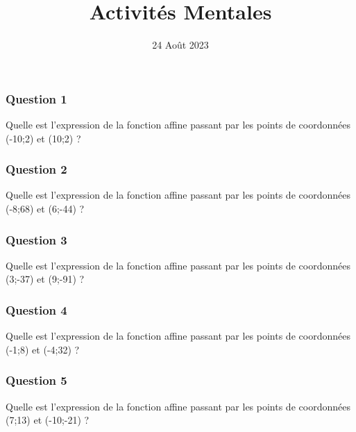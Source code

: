 \documentclass[15pt, mathserif]{beamer}
\title{Activités Mentales}
\date{24 Août 2023}
\begin{document}
\begin{frame}
    \titlepage
\end{frame}

\begin{frame} 
	\frametitle{Question 1}
Quelle est l'expression de la fonction affine passant par les points de coordonnées (-10;2) et (10;2) ?\end{frame}


\begin{frame} 
	\frametitle{Question 2}
Quelle est l'expression de la fonction affine passant par les points de coordonnées (-8;68) et (6;-44) ?\end{frame}


\begin{frame} 
	\frametitle{Question 3}
Quelle est l'expression de la fonction affine passant par les points de coordonnées (3;-37) et (9;-91) ?\end{frame}


\begin{frame} 
	\frametitle{Question 4}
Quelle est l'expression de la fonction affine passant par les points de coordonnées (-1;8) et (-4;32) ?\end{frame}


\begin{frame} 
	\frametitle{Question 5}
Quelle est l'expression de la fonction affine passant par les points de coordonnées (7;13) et (-10;-21) ?\end{frame}
\end{document}

